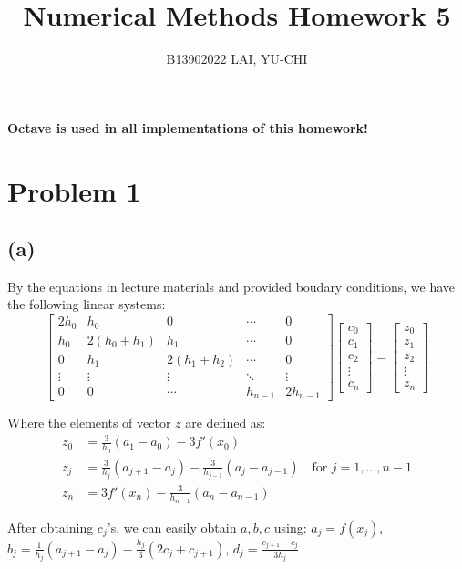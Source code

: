 \documentclass[11pt]{article}
\title{Numerical Methods Homework 5}
\author{B13902022 LAI, YU-CHI}
\date{}
\begin{document}
\maketitle

\noindent\textbf{Octave is used in all implementations of this homework!}
\section*{Problem 1}
\subsection*{(a)}
By the equations in lecture materials and provided boudary conditions, we have the following linear systems:
\begin{equation*}
\begin{bmatrix}
2h_0 & h_0 & 0 & \cdots & 0 \\
h_0 & 2(h_0+h_1) & h_1 & \cdots & 0 \\
0 & h_1 & 2(h_1+h_2) & \cdots & 0 \\
\vdots & \vdots & \vdots & \ddots & \vdots \\
0 & 0 & \cdots & h_{n-1} & 2h_{n-1}
\end{bmatrix}
\begin{bmatrix}
c_0 \\
c_1 \\
c_2 \\
\vdots \\
c_n
\end{bmatrix}
=
\begin{bmatrix}
z_0 \\
z_1 \\
z_2 \\
\vdots \\
z_n
\end{bmatrix}
\end{equation*}

Where the elements of vector $z$ are defined as:
\begin{align*}
z_0 &= \frac{3}{h_0}(a_1 - a_0) - 3f'(x_0) \\
z_j &= \frac{3}{h_j}(a_{j+1} - a_j) - \frac{3}{h_{j-1}}(a_j - a_{j-1}) \quad \text{for } j = 1, \dots, n-1 \\
z_n &= 3f'(x_n) - \frac{3}{h_{n-1}}(a_n - a_{n-1})
\end{align*}

After obtaining $c_j$'s, we can easily obtain $a,b,c$ using: $a_j=f(x_j)$, $b_j = \frac{1}{h_j}(a_{j+1} - a_j) - \frac{h_j}{3}(2c_j + c_{j+1})$, $d_j = \frac{c_{j+1} - c_j}{3h_j}$
\inputminted{octave}{my_spline.m} 
\end{document}
